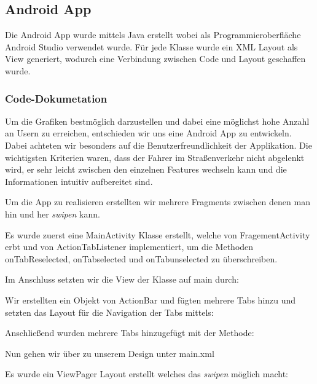 \subsection{Android App}
\label{subsec:androidapp}

Die Android App wurde mittels Java erstellt wobei als Programmieroberfläche Android Studio verwendet wurde.
Für jede Klasse wurde ein XML Layout als View generiert, wodurch eine Verbindung zwischen Code und Layout geschaffen wurde.

\subsubsection{Code-Dokumetation}

 Um die Grafiken bestmöglich darzustellen und dabei eine möglichst hohe Anzahl an Usern zu erreichen, entschieden wir uns eine Android App zu entwickeln.
 Dabei achteten wir besonders auf die Benutzerfreundlichkeit der Applikation.
 Die wichtigsten Kriterien waren, dass der Fahrer im Straßenverkehr nicht abgelenkt wird, er sehr leicht zwischen den einzelnen Features wechseln kann und die Informationen intuitiv aufbereitet sind.
 
 Um die App zu realisieren erstellten wir mehrere Fragments zwischen denen man hin und her \textit{swipen} kann.
 

 Es wurde zuerst eine MainActivity Klasse erstellt, welche von FragementActivity erbt und von ActionTabListener implementiert, um die Methoden onTabReselected, onTabselected und onTabunselected zu überschreiben.   
 
            
Im Anschluss setzten wir die View der Klasse auf main durch:  



Wir erstellten ein Objekt von ActionBar und fügten mehrere Tabs hinzu und setzten das Layout für die Navigation der Tabs mittels:



Anschließend wurden mehrere Tabs hinzugefügt mit der Methode:




Nun gehen wir über zu unserem Design unter main.xml

Es wurde ein ViewPager Layout erstellt welches das \textit{swipen} möglich macht:

